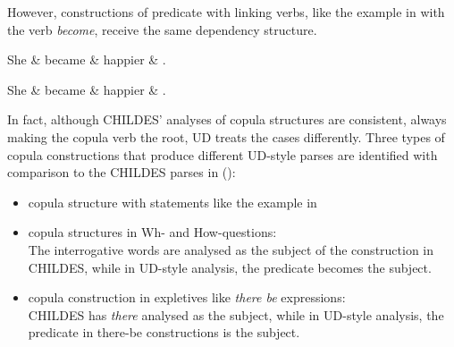 However, constructions of predicate with linking verbs, like the example in  with the verb \emph{become}, receive the same dependency structure.\\

\begin{minipage}[b]{0.5\linewidth}
\begin{dependency}
    \begin{deptext}[column sep=0.5cm]
    She \& became \& happier \& .\\
    \end{deptext}
\end{dependency}
\end{minipage}
\begin{minipage}[b]{0.5\linewidth}
\begin{dependency}
    \begin{deptext}[column sep=0.5cm]
    She \& became \& happier \& .\\
    \end{deptext}
\end{dependency}
\end{minipage}
\label{fig:become}
\vspace{0.5em}

In fact, although CHILDES' analyses of copula structures are consistent, always making the copula verb the root, UD treats the cases differently. Three types of copula constructions that produce different UD-style parses are identified with comparison to the CHILDES parses in (\cite{liu2021}):
\begin{itemize}
	\item copula structure with statements like the example in 
	\item copula structures in Wh- and How-questions:\\ The interrogative words are analysed as the subject of the construction in CHILDES, while in UD-style analysis, the predicate becomes the subject.
	\item copula construction in expletives like \emph{there be} expressions:\\
	CHILDES has \emph{there} analysed as the subject, while in UD-style analysis, the predicate in there-be constructions is the subject.
\end{itemize}

